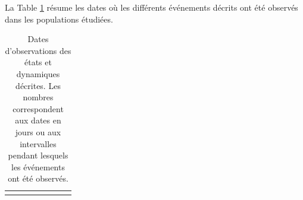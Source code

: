 La Table \ref{tab:SP} résume les dates où les différents événements décrits ont
été observés dans les populations étudiées. 

{\tiny
\begin{longtable}{
	p{}%
 	p{}
 	p{}%
 	p{}
 	p{}%
 	p{}
 	p{}%
 	p{}}

\caption{Dates d'observations des états et dynamiques
 	décrites. Les nombres correspondent aux dates en jours ou aux
 	intervalles pendant lesquels les événements ont été
 	observés.\label{tab:SP}}\\
 	 	
 	\hline
 	\endhead
 	
\hline
\endfoot



\end{longtable}}
